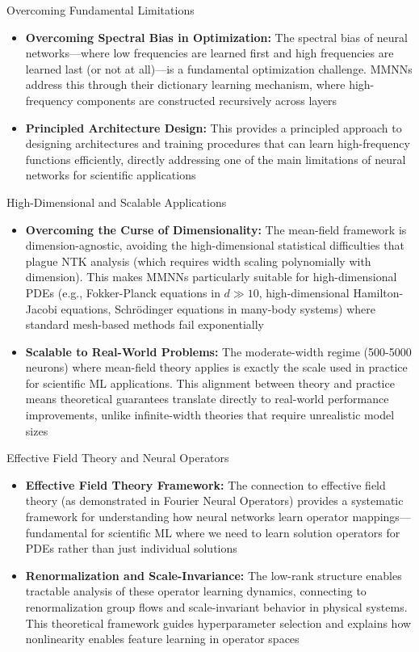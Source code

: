 \documentclass[aspectratio=169]{beamer}
\begin{document}
\begin{frame}{Overcoming Fundamental Limitations}
\begin{itemize}
\item \textbf{Overcoming Spectral Bias in Optimization:} The spectral bias of neural networks—where low frequencies are learned first and high frequencies are learned last (or not at all)—is a fundamental optimization challenge. MMNNs address this through their dictionary learning mechanism, where high-frequency components are constructed recursively across layers
\item \textbf{Principled Architecture Design:} This provides a principled approach to designing architectures and training procedures that can learn high-frequency functions efficiently, directly addressing one of the main limitations of neural networks for scientific applications
\end{itemize}
\end{frame}

\begin{frame}{High-Dimensional and Scalable Applications}
\begin{itemize}
\item \textbf{Overcoming the Curse of Dimensionality:} The mean-field framework is dimension-agnostic, avoiding the high-dimensional statistical difficulties that plague NTK analysis (which requires width scaling polynomially with dimension). This makes MMNNs particularly suitable for high-dimensional PDEs (e.g., Fokker-Planck equations in $d \gg 10$, high-dimensional Hamilton-Jacobi equations, Schrödinger equations in many-body systems) where standard mesh-based methods fail exponentially
\item \textbf{Scalable to Real-World Problems:} The moderate-width regime (500-5000 neurons) where mean-field theory applies is exactly the scale used in practice for scientific ML applications. This alignment between theory and practice means theoretical guarantees translate directly to real-world performance improvements, unlike infinite-width theories that require unrealistic model sizes
\end{itemize}
\end{frame}

\begin{frame}{Effective Field Theory and Neural Operators}
\begin{itemize}
\item \textbf{Effective Field Theory Framework:} The connection to effective field theory (as demonstrated in Fourier Neural Operators) provides a systematic framework for understanding how neural networks learn operator mappings—fundamental for scientific ML where we need to learn solution operators for PDEs rather than just individual solutions
\item \textbf{Renormalization and Scale-Invariance:} The low-rank structure enables tractable analysis of these operator learning dynamics, connecting to renormalization group flows and scale-invariant behavior in physical systems. This theoretical framework guides hyperparameter selection and explains how nonlinearity enables feature learning in operator spaces
\end{itemize}
\end{frame}
\end{document}
